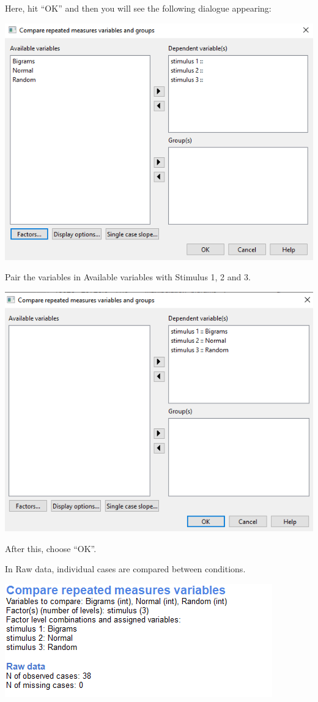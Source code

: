 \documentclass[
]{book}
\begin{document}
Here, hit ``OK'' and then you will see the following dialogue appearing:

\includegraphics{img/ch9/9.4CRMVAG_dependents.png}

Pair the variables in Available variables with Stimulus 1, 2 and 3.

\includegraphics{img/ch9/9.4CRMVAG_dependentsset.png}

After this, choose ``OK''.

In Raw data, individual cases are compared between conditions.

\includegraphics{img/ch9/9.4CRMVAG_info.png}
\end{document}
